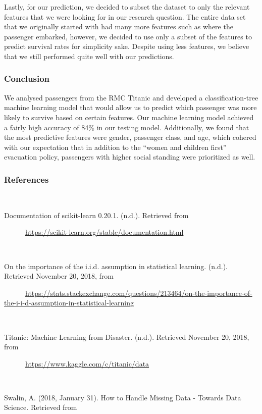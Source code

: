 \documentclass[]{article}
\begin{document}
Lastly, for our prediction, we decided to subset the dataset to only the
relevant features that we were looking for in our research question. The
entire data set that we originally started with had many more features
such as where the passenger embarked, however, we decided to use only a
subset of the features to predict survival rates for simplicity sake.
Despite using less features, we believe that we still performed quite
well with our predictions.

\subsubsection{Conclusion}\label{conclusion}

We analysed passengers from the RMC Titanic and developed a
classification-tree machine learning model that would allow us to
predict which passenger was more likely to survive based on certain
features. Our machine learning model achieved a fairly high accuracy of
84\% in our testing model. Additionally, we found that the most
predictive features were gender, passenger class, and age, which cohered
with our expectation that in addition to the ``women and children
first'' evacuation policy, passengers with higher social standing were
prioritized as well.

\newpage

\subsubsection{References}\label{references}

~

Documentation of scikit-learn 0.20.1. (n.d.). Retrieved from

~~~~~~\url{https://scikit-learn.org/stable/documentation.html}

~

On the importance of the i.i.d. assumption in statistical learning.
(n.d.). Retrieved November 20, 2018, from

~~~~~~\url{https://stats.stackexchange.com/questions/213464/on-the-importance-of-the-i-i-d-assumption-in-statistical-learning}

~

Titanic: Machine Learning from Disaster. (n.d.). Retrieved November 20,
2018, from

~~~~~~\url{https://www.kaggle.com/c/titanic/data}

~

Swalin, A. (2018, January 31). How to Handle Missing Data - Towards Data
Science. Retrieved from
\end{document}
